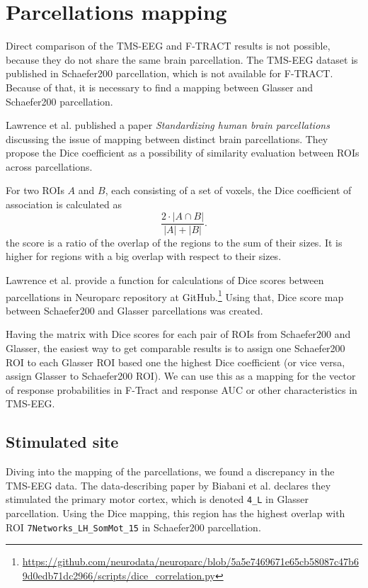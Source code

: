 \section{Parcellations mapping}\label{sec:dice}

Direct comparison of the TMS-EEG and F-TRACT results is not possible, because they do not share the same brain parcellation. The TMS-EEG dataset is published in Schaefer200 parcellation, which is not available for F-TRACT. Because of that, it is necessary to find a mapping between Glasser and Schaefer200 parcellation.

Lawrence et al. published a paper \textit{Standardizing human brain parcellations} \cite{lawrence_standardizing_2021} discussing the issue of mapping between distinct brain parcellations. They propose the Dice coefficient \cite{dice_measures_1945} as a possibility of similarity evaluation between ROIs across parcellations. 

For two ROIs $A$ and $B$, each consisting of a set of voxels, the Dice coefficient of association is calculated as  
$$
\frac{2 \cdot |A\cap B|}{|A|+|B|}.
$$
the score is a ratio of the overlap of the regions to the sum of their sizes. It is higher for regions with a big overlap with respect to their sizes.

Lawrence et al. provide a function for calculations of Dice scores between parcellations in Neuroparc repository at GitHub.\footnote{\url{https://github.com/neurodata/neuroparc/blob/5a5e7469671e65cb58087c47b69d0edb71dc2966/scripts/dice_correlation.py}} Using that, Dice score map between Schaefer200 and Glasser parcellations was created.

Having the matrix with Dice scores for each pair of ROIs from Schaefer200 and Glasser, the easiest way to get comparable results is to assign one Schaefer200 ROI to each Glasser ROI based one the highest Dice coefficient (or vice versa, assign Glasser to Schaefer200 ROI). We can use this as a mapping for the vector of response probabilities in F-Tract and response AUC or other characteristics in TMS-EEG. 

\subsection{Stimulated site}\label{sec:parcellations-mapping-stimulated_roi}

Diving into the mapping of the parcellations, we found a discrepancy in the TMS-EEG data. The data-describing paper by Biabani et al. \cite{biabani_characterizing_2019} declares they stimulated the primary motor cortex, which is denoted \texttt{4\_L} in Glasser parcellation. Using the Dice mapping, this region has the highest overlap with ROI \texttt{7Networks\_LH\_SomMot\_15} in Schaefer200 parcellation. 


